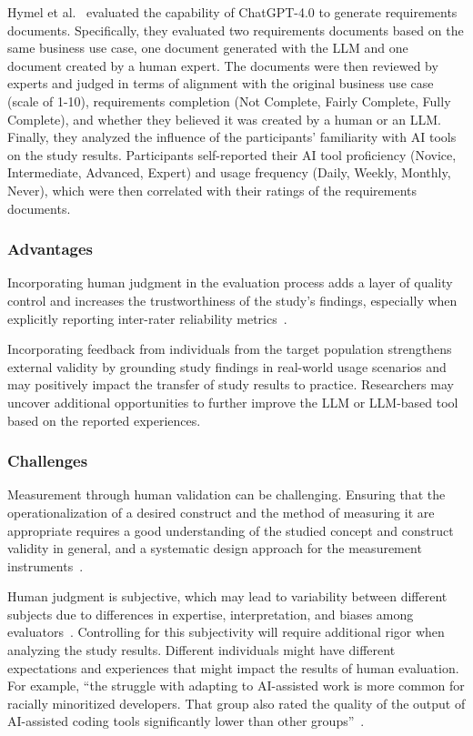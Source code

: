 Hymel et al.~\cite{hymel2025analysisllmsvshuman} evaluated the capability of ChatGPT-4.0 to generate requirements documents. 
Specifically, they evaluated two requirements documents based on the same business use case, one document generated with the LLM and one document created by a human expert.
The documents were then reviewed by experts and judged in terms of alignment with the original business use case (scale of 1-10), requirements completion (Not Complete, Fairly Complete, Fully Complete), and whether they believed it was created by a human or an LLM.
Finally, they analyzed the influence of the participants' familiarity with AI tools on the study results.
Participants self-reported their AI tool proficiency (Novice, Intermediate, Advanced, Expert) and usage frequency (Daily, Weekly, Monthly, Never), which were then correlated with their ratings of the requirements documents.


\subsubsection{Advantages}

Incorporating human judgment in the evaluation process adds a layer of quality control and increases the trustworthiness of the study's findings, especially when explicitly reporting inter-rater reliability metrics~\cite{khraisha2024canlargelanguagemodelshumans}.

Incorporating feedback from individuals from the target population strengthens external validity by grounding study findings in real-world usage scenarios and may positively impact the transfer of study results to practice.
Researchers may uncover additional opportunities to further improve the LLM or LLM-based tool based on the reported experiences.

\subsubsection{Challenges}

Measurement through human validation can be challenging.
Ensuring that the operationalization of a desired construct and the method of measuring it are appropriate requires a good understanding of the studied concept and construct validity in general, and a systematic design approach for the measurement instruments~\cite{DBLP:journals/tse/SjobergB23}.

Human judgment is subjective, which may lead to variability between different subjects due to differences in expertise, interpretation, and biases among evaluators~\cite{DBLP:journals/pacmhci/McDonaldSF19}.
Controlling for this subjectivity will require additional rigor when analyzing the study results.
Different individuals might have different expectations and experiences that might impact the results of human evaluation. For example, \enquote{the struggle with adapting to AI-assisted work is more common for racially minoritized developers. That group also rated the quality of the output of AI-assisted coding tools significantly lower than other groups}~\cite{hicks_lee_foster-marks_2025}.

